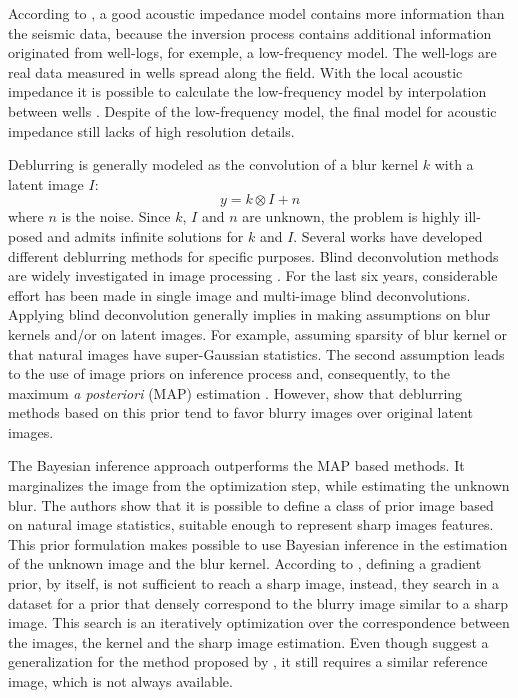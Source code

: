 \documentclass[conference]{IEEEtran}
\begin{document}
According to \cite{Latimer2017}, a good acoustic impedance model contains more information
than the seismic data, because the inversion process contains additional information originated from well-logs, for
exemple, a low-frequency model.
The well-logs are real data measured in wells spread along the field.
With the local acoustic impedance it is possible to calculate the low-frequency
model by interpolation between wells \cite{Buland2003,Figueiredo2012}. Despite of the
low-frequency model, the final model for acoustic impedance still lacks of high resolution details.

Deblurring is generally modeled as the convolution of a blur kernel $k$
with a latent image $I$: 
\begin{equation}
 y = k \otimes I + n
 \label{eq:deblurr}
\end{equation}
where $n$ is the noise. Since $k$, $I$ and $n$ are unknown, the problem 
is highly ill-posed and admits infinite solutions for $k$ and $I$.
Several works have developed different deblurring methods for specific purposes.
Blind deconvolution methods are widely investigated in image processing \cite{Bishop2007}.
For the last six years, considerable effort has been made in single image
\cite{Babacan2012,Krishnan2015,Levin2011,Zhang2011} and multi-image \cite{sroubek2012,Zhu2012} blind deconvolutions. 
Applying blind deconvolution generally implies in making assumptions on
blur kernels and/or on latent images. For example, assuming sparsity of blur kernel
or that natural images have super-Gaussian statistics. The second assumption
leads to the use of image priors on inference process and, consequently, to the maximum \textit{a posteriori}
(MAP) estimation \cite{Babacan2012}. However, \cite{Levin} show that deblurring methods
based on this prior tend to favor blurry images over original latent images.

The Bayesian inference approach \cite{Levin} outperforms the MAP based methods. It marginalizes
the image from the optimization step, while estimating the unknown blur.
The authors show that it is possible to define a class of prior image
based on natural image statistics, suitable enough to represent sharp images features.
This prior formulation makes possible to use Bayesian inference in the estimation of the
unknown image and the blur kernel. According to \cite{Hacohen13}, defining a gradient
prior, by itself, is not sufficient to reach a sharp image, instead,
they search in a dataset for a prior that densely correspond to
the blurry image similar to a sharp image. This search is an
iteratively optimization over the correspondence between the images, the kernel and
the sharp image estimation. Even though \cite{Pan2014} suggest a generalization
for the method proposed by \cite{Hacohen13}, it still requires a similar reference image,
which is not always available.
\end{document}
